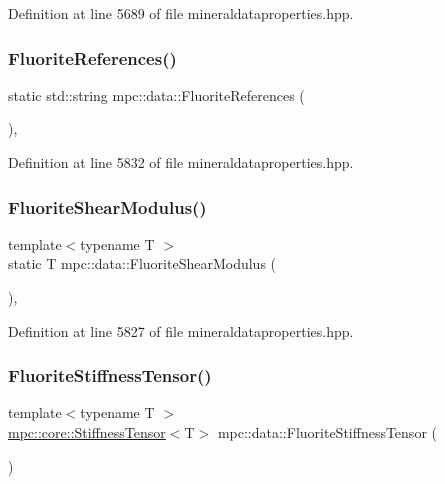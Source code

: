 Definition at line 5689 of file mineraldataproperties.\+hpp.

\mbox{\label{namespacempc_1_1data_abdd0aceded0abf960de4a0dad20bfa2f}} 
\subsubsection{\texorpdfstring{Fluorite\+References()}{FluoriteReferences()}}
{\footnotesize\ttfamily static std\+::string mpc\+::data\+::\+Fluorite\+References (\begin{DoxyParamCaption}{ }\end{DoxyParamCaption})\hspace{0.3cm}{\ttfamily [inline]}, {\ttfamily [static]}}



Definition at line 5832 of file mineraldataproperties.\+hpp.

\mbox{\label{namespacempc_1_1data_af26256e493b9d16e48589f42bbe88adb}} 
\subsubsection{\texorpdfstring{Fluorite\+Shear\+Modulus()}{FluoriteShearModulus()}}
{\footnotesize\ttfamily template$<$typename T $>$ \\
static T mpc\+::data\+::\+Fluorite\+Shear\+Modulus (\begin{DoxyParamCaption}{ }\end{DoxyParamCaption})\hspace{0.3cm}{\ttfamily [inline]}, {\ttfamily [static]}}



Definition at line 5827 of file mineraldataproperties.\+hpp.

\mbox{\label{namespacempc_1_1data_ab1ea872183bafecc882ff55086295f85}} 
\subsubsection{\texorpdfstring{Fluorite\+Stiffness\+Tensor()}{FluoriteStiffnessTensor()}}
{\footnotesize\ttfamily template$<$typename T $>$ \\
\mbox{\hyperlink{structmpc_1_1core_1_1_stiffness_tensor}{mpc\+::core\+::\+Stiffness\+Tensor}}$<$T$>$ mpc\+::data\+::\+Fluorite\+Stiffness\+Tensor (\begin{DoxyParamCaption}{ }\end{DoxyParamCaption})}



